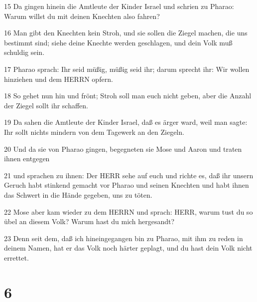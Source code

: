 \par 15 Da gingen hinein die Amtleute der Kinder Israel und schrien zu Pharao: Warum willst du mit deinen Knechten also fahren?
\par 16 Man gibt den Knechten kein Stroh, und sie sollen die Ziegel machen, die uns bestimmt sind; siehe deine Knechte werden geschlagen, und dein Volk muß schuldig sein.
\par 17 Pharao sprach: Ihr seid müßig, müßig seid ihr; darum sprecht ihr: Wir wollen hinziehen und dem HERRN opfern.
\par 18 So gehet nun hin und frönt; Stroh soll man euch nicht geben, aber die Anzahl der Ziegel sollt ihr schaffen.
\par 19 Da sahen die Amtleute der Kinder Israel, daß es ärger ward, weil man sagte: Ihr sollt nichts mindern von dem Tagewerk an den Ziegeln.
\par 20 Und da sie von Pharao gingen, begegneten sie Mose und Aaron und traten ihnen entgegen
\par 21 und sprachen zu ihnen: Der HERR sehe auf euch und richte es, daß ihr unsern Geruch habt stinkend gemacht vor Pharao und seinen Knechten und habt ihnen das Schwert in die Hände gegeben, uns zu töten.
\par 22 Mose aber kam wieder zu dem HERRN und sprach: HERR, warum tust du so übel an diesem Volk? Warum hast du mich hergesandt?
\par 23 Denn seit dem, daß ich hineingegangen bin zu Pharao, mit ihm zu reden in deinem Namen, hat er das Volk noch härter geplagt, und du hast dein Volk nicht errettet.

\chapter{6}


